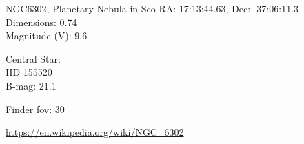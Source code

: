 \begin{block}{NGC6302, Planetary Nebula in Sco}
    RA: 17:13:44.63, Dec: -37:06:11.3 \\ 
    Dimensions: 0.74 \\ 
    Magnitude (V): 9.6

    Central Star: \\ 
      \hspace{1em}HD 155520 \\ 
      \hspace{1em}B-mag: 21.1 


    Finder fov: 30 

    \url{https://en.wikipedia.org/wiki/NGC_6302} 
\end{block}